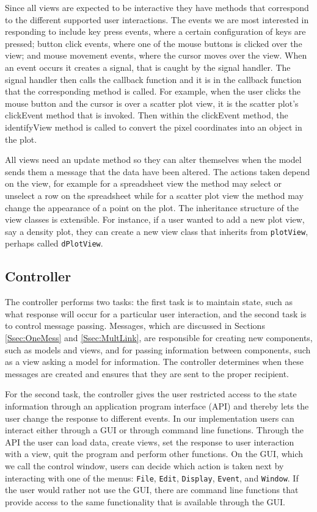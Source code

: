\documentclass[11pt]{article}
\newcommand{\Rfunction}[1]{{\textsf{#1}}}
\newcommand{\Rclass}[1]{\texttt{#1}}
\begin{document}
Since all views are expected to be interactive they have methods that
correspond to the different supported user interactions.  The events
we are most interested in responding to include key press events,
where a certain configuration of keys are pressed; button click
events, where one of the mouse buttons is clicked over the view; and
mouse movement events, where the cursor moves over the view.  When an
event occurs it creates a signal, that is caught by the signal
handler.  The signal handler then calls the callback function and it
is in the callback function that the corresponding method is called.
For example, when the user clicks the mouse button and the cursor is
over a scatter plot view, it is the scatter plot's
\Rfunction{clickEvent} method that is invoked.  Then within the
\Rfunction{clickEvent} method, the \Rfunction{identifyView} method is called
to convert the pixel coordinates into an object in the plot.

All views need an update method so they can alter themselves when the
model sends them a message that the data have been altered. The
actions taken depend on the view, for example for a spreadsheet view
the method may select or unselect a row on the spreadsheet while for
a scatter plot view the method may change the appearance of a point on
the plot.  The inheritance structure of the view classes is
extensible.  For instance, if a user wanted to add a new plot view,
say a density plot, they can create a new view class that inherits
from \Rclass{plotView}, perhaps called \Rclass{dPlotView}.

\subsection{Controller}
\label{Ssec:OneCont}

The controller performs two tasks: the first task is to maintain state,
such as what response will occur for a particular user interaction, 
and the second task is to control message passing.  Messages, which are
discussed in Sections \ref{Ssec:OneMess} and \ref{Ssec:MultLink}, are
responsible for creating new components, such as models and views, and for
passing information between components, such as a view asking a model for
information.  The controller determines when these messages are created and
ensures that they are sent to the proper recipient.

For the second task, the controller gives the user restricted access
to the state information through an application program interface
(API) and thereby lets the user change the response to different events. 
In our implementation users can interact either through a GUI
or through command line functions.  Through the API the user can load
data, create views, set the response to user interaction with a view,
quit the program and perform other functions.  On the GUI, which we call the
control window, users can decide which action is taken next by interacting
with one of the menus: \texttt{File}, \texttt{Edit},
\texttt{Display}, \texttt{Event}, and \texttt{Window}.  If the user
would rather not use the GUI, there are command line functions that
provide access to the same functionality that is available through the
GUI.  
\end{document}
